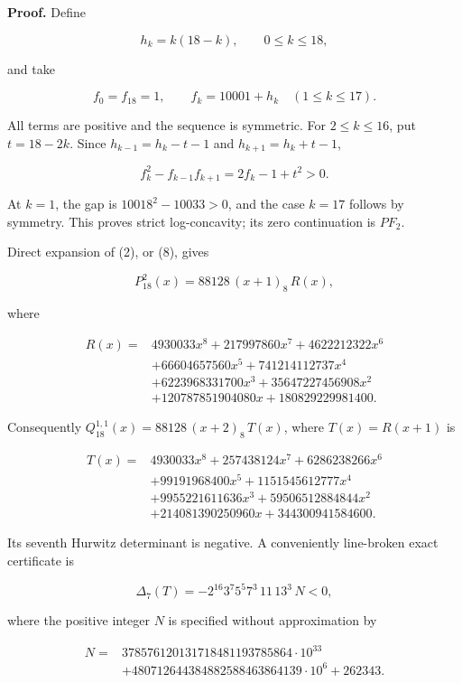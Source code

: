 \documentclass[11pt]{article}
\begin{document}
\textbf{Proof.} Define

\[
h_k=k(18-k),\qquad 0\le k\le18,
\tag{14}
\]

and take

\[
f_0=f_{18}=1,\qquad
f_k=10001+h_k\quad(1\le k\le17).
\tag{15}
\]

All terms are positive and the sequence is symmetric. For
\(2\le k\le16\), put \(t=18-2k\). Since \(h_{k-1}=h_k-t-1\) and
\(h_{k+1}=h_k+t-1\),

\[
f_k^2-f_{k-1}f_{k+1}=2f_k-1+t^2>0.
\tag{16}
\]

At \(k=1\), the gap is \(10018^2-10033>0\), and the case \(k=17\)
follows by symmetry. This proves strict log-concavity; its zero
continuation is \(PF_2\).

Direct expansion of (2), or (8), gives

\[
P_{18}^2(x)=88128\,(x+1)_8\,R(x),
\tag{17}
\]

where

\[
\begin{aligned}
R(x)={}&4930033x^8+217997860x^7+4622212322x^6\\
&+66604657560x^5+741214112737x^4\\
&+6223968331700x^3+35647227456908x^2\\
&+120787851904080x+180829229981400.
\end{aligned}
\tag{18}
\]

Consequently \(Q_{18}^{1,1}(x)=88128\,(x+2)_8\,T(x)\), where
\(T(x)=R(x+1)\) is

\[
\begin{aligned}
T(x)={}&4930033x^8+257438124x^7+6286238266x^6\\
&+99191968400x^5+1151545612777x^4\\
&+9955221611636x^3+59506512884844x^2\\
&+214081390250960x+344300941584600.
\end{aligned}
\tag{19}
\]

Its seventh Hurwitz determinant is negative. A conveniently line-broken
exact certificate is

\[
\Delta_7(T)=-2^{16}3^7 5^5 7^3\,11\,13^3\,N<0,
\tag{20}
\]

where the positive integer \(N\) is specified without approximation by

\[
\begin{aligned}
N={}&378576120131718481193785864\cdot10^{33}\\
&+480712644384882588463864139\cdot10^6+262343.
\end{aligned}
\tag{21}
\]
\end{document}
